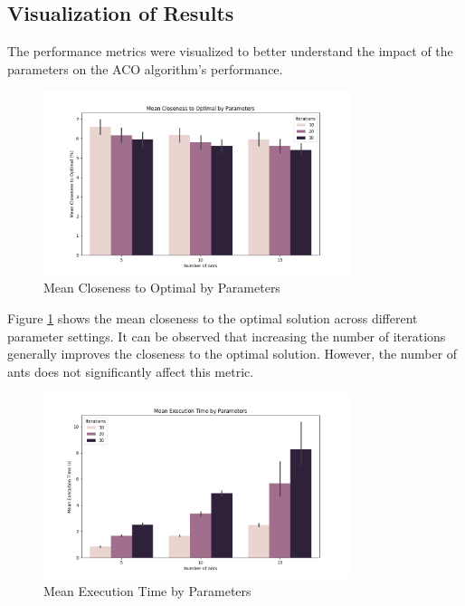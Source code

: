 \documentclass[
]{article}
\begin{document}
    \subsection{Visualization of Results}\label{subsec:visualization-of-results}
    The performance metrics were visualized to better understand the impact of the parameters on the ACO algorithm's performance.

    \begin{figure}[H]
        \centering
        \includegraphics[width=0.8\textwidth]{./aco/aco_mean_closeness_to_optimal.png}
        \caption{Mean Closeness to Optimal by Parameters}
        \label{fig:aco_mean_closeness_to_optimal}
    \end{figure}

    Figure \ref{fig:aco_mean_closeness_to_optimal} shows the mean closeness to the optimal solution across different parameter settings. It can be observed that increasing the number of iterations generally improves the closeness to the optimal solution. However, the number of ants does not significantly affect this metric.

    \begin{figure}[H]
        \centering
        \includegraphics[width=0.8\textwidth]{./aco/aco_mean_execution_time.png}
        \caption{Mean Execution Time by Parameters}
        \label{fig:aco_mean_execution_time}
    \end{figure}
\end{document}
